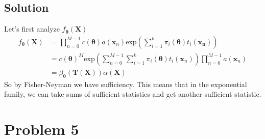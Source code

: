\documentclass[a4paper]{article}
\begin{document}
\subsection*{Solution}%
Let's first analyze $f_{\bm{\theta}}(\bm{X})$
\[
  \begin{aligned}
    f_{\bm{\theta}}(\bm{X}) &=  \prod_{n=0}^{M-1} c(\bm{\theta})a(\bm{x}_n)\text{exp} \left( \sum_{i=1}^k \pi_i(\bm{\theta})t_i(\bm{x_n}) \right) \\
                            &= c(\bm{\theta})^M \text{exp} \left( \sum_{n=0}^{M-1} \sum_{i=1}^k \pi_i(\bm{\theta}) t_i(\bm{x}_n) \right) \prod_{n=0}^{M-1} a(\bm{x}_n) \\
                            &= \beta_{\bm{\theta}}(\bm{T}(\bm{X})) \alpha(\bm{X})
  \end{aligned}
\]
So by Fisher-Neyman we have sufficiency. This means that in the exponential family, we can take sums of sufficient statistics and get another sufficient statistic.

\section*{Problem 5}%
\label{sec:Problem 5}
\end{document}
